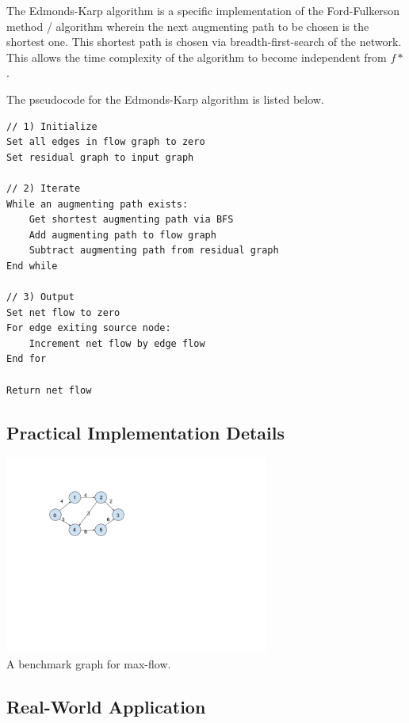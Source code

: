 \documentclass[12pt]{amsart}
\begin{document}
    The Edmonds-Karp algorithm is a specific implementation of
    the Ford-Fulkerson method / algorithm wherein the next
    augmenting path to be chosen is the shortest one. This
    shortest path is chosen via breadth-first-search of the
    network. This allows the time complexity of the algorithm
    to become independent from $f*$.

    The pseudocode for the Edmonds-Karp algorithm is listed
    below.

\begin{verbatim}
// 1) Initialize
Set all edges in flow graph to zero
Set residual graph to input graph

// 2) Iterate
While an augmenting path exists:
    Get shortest augmenting path via BFS
    Add augmenting path to flow graph
    Subtract augmenting path from residual graph
End while

// 3) Output
Set net flow to zero
For edge exiting source node:
    Increment net flow by edge flow
End for

Return net flow
\end{verbatim}

\subsection{Practical Implementation Details}

\begin{center}
    \includegraphics[width=0.65\textwidth]{graph} \\
    A benchmark graph for max-flow. \\
    \vskip 1cm
\end{center}

\subsection{Real-World Application}
\end{document}
